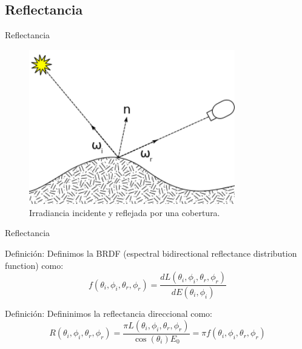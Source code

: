 \documentclass[handout]{beamer}
\begin{document}
\subsection{Reflectancia}

\begin{frame}{Reflectancia}
  \begin{figure}
  \centering
  \includegraphics[width=0.8\textwidth]{imagenes/brdf.png}
  \caption{Irradiancia incidente y reflejada por una cobertura.}
  \end{figure}
\end{frame}

\begin{frame}{Reflectancia}
  \begin{block}{Definici\'on:}
    Definimos la BRDF (espectral bidirectional reflectance distribution function) como:
    $$ f(\theta_i, \phi_i, \theta_r, \phi_r) = \frac{dL(\theta_i, \phi_i, \theta_r, \phi_r)}{dE(\theta_i, \phi_i)}$$
  \end{block}
  \pause
  \begin{block}{Definici\'on:}
    Defininimos la reflectancia direccional como:
    $$ R(\theta_i, \phi_i, \theta_r, \phi_r) = \frac{\pi L(\theta_i, \phi_i, \theta_r, \phi_r)}{\cos(\theta_i) E_0} = \pi f(\theta_i, \phi_i, \theta_r, \phi_r)$$
  \end{block}
\end{frame}
\end{document}
